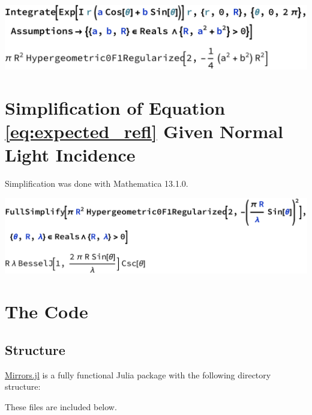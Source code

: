 \documentclass[etd,twoside,senior]{BYUPhys}
\begin{document}
\begin{appendices}
  \includegraphics[width=\textwidth]{nasty-integral.pdf}
  
  
  
  \chapter{Simplification of Equation \ref{eq:expected_refl} Given Normal Light Incidence}\label{chap:airy_validation}
  
  Simplification was done with Mathematica 13.1.0.
  
  \includegraphics[width=\textwidth]{airy-simplification.pdf}
  
  
  
  \chapter{The Code}\label{chap:julia}
  
  \section{Structure}
  
  \href{https://github.com/mjg0/Mirrors.jl}{Mirrors.jl} is a fully functional Julia package with the following directory structure:
  
  
  
  These files are included below.
  
  \begin{tiny}
    
  \end{tiny}
  
\end{appendices}








\printindex
\end{document}

